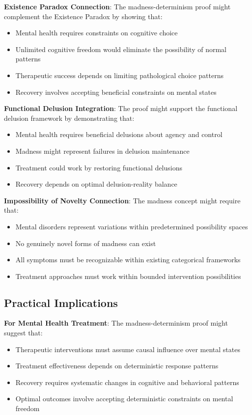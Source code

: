 \documentclass[12pt]{article}
\begin{document}
{\textbf{Existence Paradox Connection}: The madness-determinism proof might complement the Existence Paradox by showing that:
\begin{itemize}
\item Mental health requires constraints on cognitive choice
\item Unlimited cognitive freedom would eliminate the possibility of normal patterns
\item Therapeutic success depends on limiting pathological choice patterns
\item Recovery involves accepting beneficial constraints on mental states
\end{itemize}

\textbf{Functional Delusion Integration}: The proof might support the functional delusion framework by demonstrating that:
\begin{itemize}
\item Mental health requires beneficial delusions about agency and control
\item Madness might represent failures in delusion maintenance
\item Treatment could work by restoring functional delusions
\item Recovery depends on optimal delusion-reality balance
\end{itemize}

\textbf{Impossibility of Novelty Connection}: The madness concept might require that:
\begin{itemize}
\item Mental disorders represent variations within predetermined possibility spaces
\item No genuinely novel forms of madness can exist
\item All symptoms must be recognizable within existing categorical frameworks
\item Treatment approaches must work within bounded intervention possibilities
\end{itemize}

\subsection{Practical Implications}

\textbf{For Mental Health Treatment}: The madness-determinism proof might suggest that:
\begin{itemize}
\item Therapeutic interventions must assume causal influence over mental states
\item Treatment effectiveness depends on deterministic response patterns
\item Recovery requires systematic changes in cognitive and behavioral patterns
\item Optimal outcomes involve accepting deterministic constraints on mental freedom
\end{itemize}

}
\end{document}
